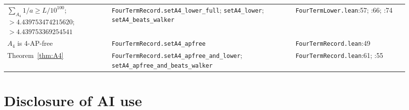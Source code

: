 \documentclass[11pt,a4paper]{article}
\theoremstyle{definition}
\theoremstyle{remark}
\newcommand{\code}[1]{\texttt{#1}}
\begin{document}
\begin{small}
\begin{longtable}{@{}>{\raggedright\arraybackslash}p{0.25\linewidth}>{\raggedright\arraybackslash}p{0.44\linewidth}>{\raggedright\arraybackslash}p{0.27\linewidth}@{}}
$\sum_{A_4} 1/a \ge L/10^{100}$; $> 4.439753474215620$; $> 4.439753369254541$ & \code{FourTermRecord.\allowbreak{}setA4\_\allowbreak{}lower\_\allowbreak{}full}; \code{setA4\_\allowbreak{}lower}; \code{setA4\_\allowbreak{}beats\_\allowbreak{}walker} & \code{FourTermLower.\allowbreak{}lean}:57; :66; :74 \\
$A_4$ is 4-AP-free & \code{FourTermRecord.\allowbreak{}setA4\_\allowbreak{}apfree} & \code{FourTermRecord.\allowbreak{}lean}:49 \\
Theorem~\ref{thm:A4} & \code{FourTermRecord.\allowbreak{}setA4\_\allowbreak{}apfree\_\allowbreak{}and\_\allowbreak{}lower}; \code{setA4\_\allowbreak{}apfree\_\allowbreak{}and\_\allowbreak{}beats\_\allowbreak{}walker} & \code{FourTermRecord.\allowbreak{}lean}:61; :55 \\
\bottomrule
\end{longtable}
\end{small}

\section{Disclosure of AI use}\label{sec:ai}
\end{document}
